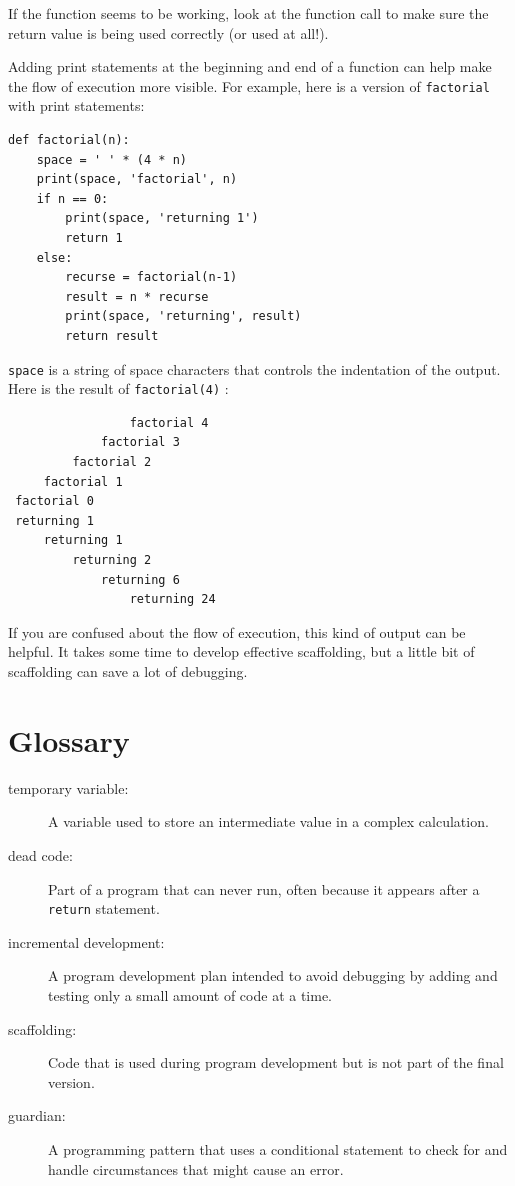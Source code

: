 \documentclass[10pt]{book}
\begin{document}
If the function seems to be working, look at the function call
to make sure the return value is being used correctly (or used
at all!).

Adding print statements at the beginning and end of a function
can help make the flow of execution more visible.
For example, here is a version of {\tt factorial} with
print statements:

\begin{verbatim}
def factorial(n):
    space = ' ' * (4 * n)
    print(space, 'factorial', n)
    if n == 0:
        print(space, 'returning 1')
        return 1
    else:
        recurse = factorial(n-1)
        result = n * recurse
        print(space, 'returning', result)
        return result
\end{verbatim}
%
{\tt space} is a string of space characters that controls the
indentation of the output.  Here is the result of {\tt factorial(4)} :

\begin{verbatim}
                 factorial 4
             factorial 3
         factorial 2
     factorial 1
 factorial 0
 returning 1
     returning 1
         returning 2
             returning 6
                 returning 24
\end{verbatim}
%
If you are confused about the flow of execution, this kind of
output can be helpful.  It takes some time to develop effective
scaffolding, but a little bit of scaffolding can save a lot of debugging.


\section{Glossary}

\begin{description}

\item[temporary variable:]  A variable used to store an intermediate value in
a complex calculation.

\item[dead code:]  Part of a program that can never run, often because
it appears after a {\tt return} statement.

\item[incremental development:]  A program development plan intended to
avoid debugging by adding and testing only
a small amount of code at a time.

\item[scaffolding:]  Code that is used during program development but is
not part of the final version.

\item[guardian:]  A programming pattern that uses a conditional
statement to check for and handle circumstances that
might cause an error.

\end{description}
\end{document}
